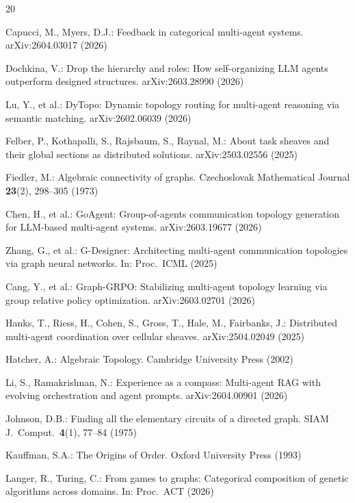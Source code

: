 \documentclass[runningheads]{llncs}
\begin{document}

\begin{thebibliography}{20}

Capucci, M., Myers, D.J.:
Feedback in categorical multi-agent systems.
arXiv:2604.03017 (2026)

Dochkina, V.:
Drop the hierarchy and roles: How self-organizing {LLM} agents
outperform designed structures.
arXiv:2603.28990 (2026)

Lu, Y., et al.:
DyTopo: Dynamic topology routing for multi-agent reasoning via
semantic matching.
arXiv:2602.06039 (2026)

Felber, P., Kothapalli, S., Rajsbaum, S., Raynal, M.:
About task sheaves and their global sections as distributed solutions.
arXiv:2503.02556 (2025)

Fiedler, M.:
Algebraic connectivity of graphs.
Czechoslovak Mathematical Journal \textbf{23}(2), 298--305 (1973)

Chen, H., et al.:
GoAgent: Group-of-agents communication topology generation for
{LLM}-based multi-agent systems.
arXiv:2603.19677 (2026)

Zhang, G., et al.:
G-Designer: Architecting multi-agent communication topologies via
graph neural networks.
In: Proc.\ ICML (2025)

Cang, Y., et al.:
Graph-GRPO: Stabilizing multi-agent topology learning via group
relative policy optimization.
arXiv:2603.02701 (2026)

Hanks, T., Riess, H., Cohen, S., Gross, T., Hale, M., Fairbanks, J.:
Distributed multi-agent coordination over cellular sheaves.
arXiv:2504.02049 (2025)

Hatcher, A.:
Algebraic Topology.
Cambridge University Press (2002)

Li, S., Ramakrishnan, N.:
Experience as a compass: Multi-agent {RAG} with evolving
orchestration and agent prompts.
arXiv:2604.00901 (2026)

Johnson, D.B.:
Finding all the elementary circuits of a directed graph.
SIAM J.\ Comput.\ \textbf{4}(1), 77--84 (1975)

Kauffman, S.A.:
The Origins of Order.
Oxford University Press (1993)

Langer, R., Turing, C.:
From games to graphs: Categorical composition of genetic algorithms
across domains.
In: Proc.\ ACT (2026)


\end{thebibliography}
\end{document}
